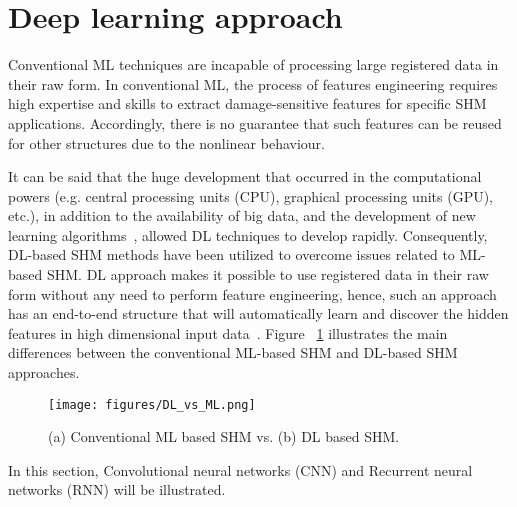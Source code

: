 \section{Deep learning approach}
Conventional ML techniques are incapable of processing large registered data in their raw form.
In conventional ML, the process of features engineering requires high expertise and skills to extract damage-sensitive features for specific SHM applications.
Accordingly, there is no guarantee that such features can be reused for other structures due to the nonlinear behaviour. 

It can be said that the huge development that occurred in the computational powers (e.g. central processing units (CPU), graphical processing units (GPU), etc.), in addition to the availability of big data, and the development of new learning algorithms~\cite{Yuan2020},  allowed DL techniques to develop rapidly.
Consequently, DL-based SHM methods have been utilized to overcome issues related to ML-based SHM.  
DL approach makes it possible to use registered data in their raw form without any need to perform feature engineering, hence, such an approach has an end-to-end structure that will automatically learn and discover the hidden features in high dimensional input data~\cite{LeCun, Networks}. 
Figure ~\ref{fig:DL_ML} illustrates the main differences between the conventional ML-based SHM and DL-based SHM approaches.

\begin{figure}[!h]
	\begin{center}
		\texttt{[image: figures/DL\_vs\_ML.png]}
	\end{center}
	\caption{(a) Conventional ML based SHM vs. (b) DL based SHM.}
	\label{fig:DL_ML}
\end{figure} 

In this section, Convolutional neural networks (CNN) and Recurrent neural networks (RNN) will be illustrated.


